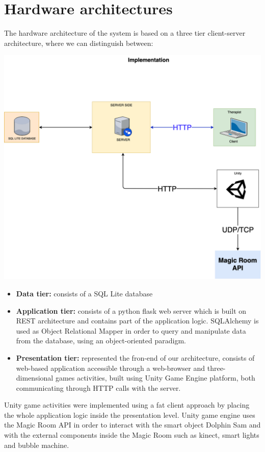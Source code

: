 	\section{Hardware architectures}
	The hardware architecture of the system is based on a three tier client-server architecture, where we can distinguish between:
	\begin{center}
		\includegraphics[width=\textwidth]{images/Architecture-Diagram.png}
	\end{center}
	\begin{itemize}
		\item \textbf{Data tier:} consists of a SQL Lite database
		\item \textbf{Application tier:} consists of a python flask web server which is built on REST architecture and contains part of the application logic. SQLAlchemy is used as Object Relational Mapper in order to query and manipulate data from the database, using an object-oriented paradigm.
		\item \textbf{Presentation tier:} represented the fron-end of our architecture, consists of web-based application accessible through a web-browser and three-dimensional games activities, built using Unity Game Engine platform, both communicating through HTTP calls with the server.
	\end{itemize}
	\noindent
	Unity game activities were implemented using a fat client approach by placing the whole application logic inside the presentation level. \newline
	Unity game engine uses the Magic Room API in order to interact with the smart object Dolphin Sam and with the external components inside the Magic Room such as kinect, smart lights and bubble machine.
	

